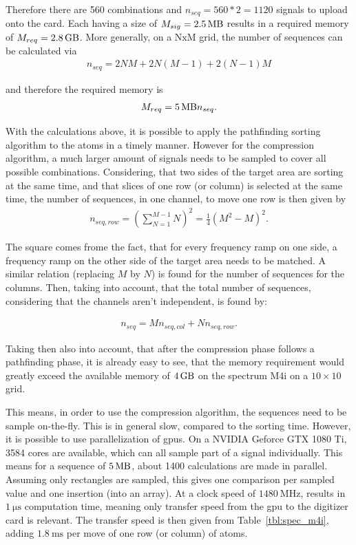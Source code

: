 Therefore there are 560 combinations and $n_{seq} = 560*2=1120$ signals to upload onto the card. Each having a size of $M_{sig} = \SI{2.5}{\mega\byte}$ results in a required memory of $M_{req}=\SI{2.8}{\giga\byte}$. More generally, on a NxM grid, the number of sequences can be calculated via
\begin{align}
	n_{seq} = 2 N M + 2 N (M-1) + 2 (N-1) M
\end{align}

and therefore the required memory is
\begin{align}
	M_{req} = \SI{5}{\mega\byte} n_{seq}.
\end{align}

With the calculations above, it is possible to apply the pathfinding sorting algorithm to the atoms in a timely manner. However for the compression algorithm, a much larger amount of signals needs to be sampled to cover all possible combinations. Considering, that two sides of the target area are sorting at the same time, and that slices of one row (or column) is selected at the same time, the number of sequences, in one channel, to move one row is then given by
\begin{align}
	n_{seq,row} = {\left(\sum_{N=1}^{M-1} N\right)}^2 = \frac{1}{4} {(M^2-M)}^2.
\end{align}

The square comes frome the fact, that for every frequency ramp on one side, a frequency ramp on the other side of the target area needs to be matched. A similar relation (replacing $M$ by $N$) is found for the number of sequences for the columns. Then, taking into account, that the total number of sequences, considering that the channels aren't independent, is found by:

\begin{align}
	n_{seq} = M n_{seq,col} + N n_{seq,row}.
\end{align}

Taking then also into account, that after the compression phase follows a pathfinding phase, it is already easy to see, that the memory requirement would greatly exceed the available memory of $\SI{4}{\giga\byte}$ on the spectrum M4i on a $10\times10$ grid.

This means, in order to use the compression algorithm, the sequences need to be sample on-the-fly. This is in general slow, compared to the sorting time. However, it is possible to use parallelization of \acp{gpu}. On a NVIDIA Geforce GTX 1080 Ti, 3584 cores are available, which can all sample part of a signal individually. This means for a sequence of $\SI{5}{\mega\byte}$, about 1400 calculations are made in parallel. Assuming only rectangles are sampled, this gives one comparison per sampled value and one insertion (into an array). At a clock speed of $\SI{1480}{\mega\hertz}$, results in $\SI{1}{\micro\second}$ computation time, meaning only transfer speed from the \ac{gpu} to the digitizer card is relevant. The transfer speed is then given from Table~\ref{tbl:spec_m4i}, adding $\SI{1.8}{\milli\second}$ per move of one row (or column) of atoms.

